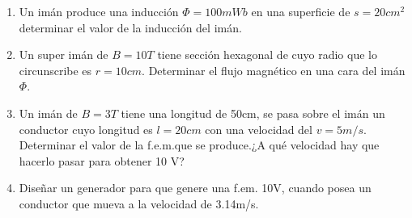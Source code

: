 \documentclass[../main]{subfiles}
\begin{document}
\begin{enumerate}
    en dar una vuelta. Realizar un gráfico donde el eje de las
    ordenadas sea el tiempo en segundos y las ordenadas el valor de
    la f.e.m generada.
  \item Un imán produce una inducción $\Phi=100mWb$ en una superficie
    de $s=20cm^2$ determinar el valor de la inducción del imán.
  \item Un super imán de $B=10T$ tiene sección hexagonal de cuyo
    radio que lo circunscribe es $r=10cm$. Determinar el flujo
    magnético en una cara del imán $\Phi$.
  \item Un imán de $B=3T$ tiene una longitud de 50cm, se pasa sobre
    el imán un conductor cuyo longitud es $l=20cm$ con una velocidad
    del $v=5m/s$. Determinar el valor de la f.e.m.que se produce.\@ ¿A
    qué velocidad hay que hacerlo pasar para obtener 10 V?
  \item Diseñar un generador para que genere una f.em. 10V, cuando
    posea un conductor que mueva a la velocidad de 3.14m/s.
\end{enumerate}
\end{document}
